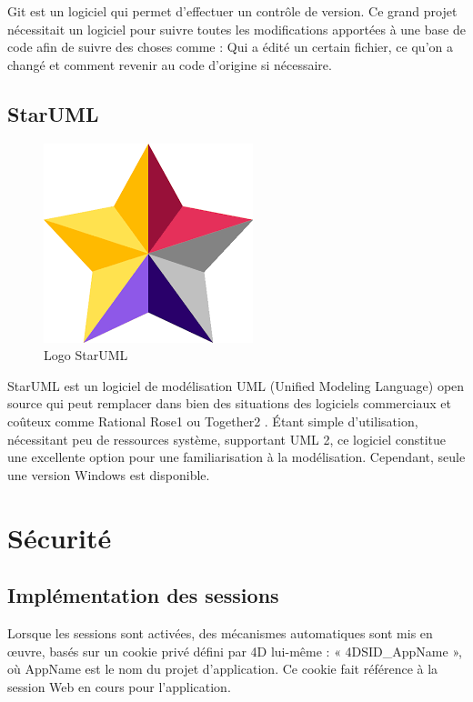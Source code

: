 Git est un logiciel qui permet d’effectuer un contrôle de
 version. Ce grand projet nécessitait un 
 logiciel pour suivre toutes les modifications apportées à une base de code afin de suivre des choses comme : Qui a édité un certain fichier, ce qu'on a changé et comment revenir au code d'origine si nécessaire.

 \subsection{StarUML}

 \begin{figure}[H]
    \centering
    \includegraphics[scale=0.4]{Logos/starUml.png}
    \caption{Logo  StarUML}
\end{figure}
 
 StarUML est un logiciel de modélisation UML (Unified Modeling Language) open source
qui peut remplacer dans bien des situations des logiciels commerciaux et coûteux
comme Rational Rose1 ou Together2
. Étant simple d’utilisation, nécessitant peu de
ressources système, supportant UML 2, ce logiciel constitue une excellente option pour
une familiarisation à la modélisation. Cependant, seule une version Windows est disponible. \cite{StarUml}

\section{Sécurité}

\subsection{Implémentation des sessions}
Lorsque les sessions sont activées, des mécanismes automatiques sont mis en œuvre, basés sur un cookie privé défini par 4D lui-même : « 4DSID\_AppName », où AppName est le nom du projet d'application. Ce cookie fait référence à la session Web en cours pour l'application. 

